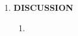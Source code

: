 \documentclass[11pt]{article}
\begin{document}
\begin{enumerate}
\begin{enumerate}
    \end{enumerate}

\item \textbf{DISCUSSION}

\begin{enumerate}
    \item 
\end{enumerate}

\end{enumerate}
\end{document}
